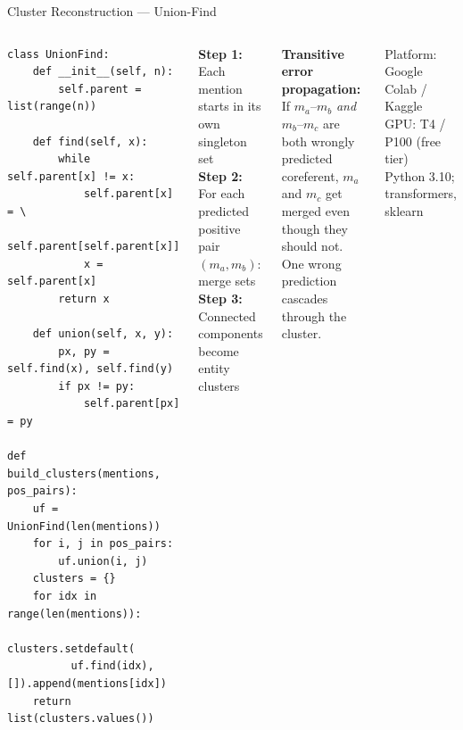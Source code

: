 \documentclass[aspectratio=169]{beamer}
\begin{document}
\begin{frame}[fragile]{Cluster Reconstruction — Union-Find}
  \begin{columns}[T]
      \begin{tcolorbox}[nbox={Python Implementation}]
\begin{lstlisting}
class UnionFind:
    def __init__(self, n):
        self.parent = list(range(n))

    def find(self, x):
        while self.parent[x] != x:
            self.parent[x] = \
              self.parent[self.parent[x]]
            x = self.parent[x]
        return x

    def union(self, x, y):
        px, py = self.find(x), self.find(y)
        if px != py:
            self.parent[px] = py

def build_clusters(mentions, pos_pairs):
    uf = UnionFind(len(mentions))
    for i, j in pos_pairs:
        uf.union(i, j)
    clusters = {}
    for idx in range(len(mentions)):
        clusters.setdefault(
          uf.find(idx),[]).append(mentions[idx])
    return list(clusters.values())
\end{lstlisting}
      \end{tcolorbox}

      \begin{tcolorbox}[rbox={How It Works}]
        \small
        \textbf{Step 1:} Each mention starts
        in its own singleton set\\[4pt]
        \textbf{Step 2:} For each predicted
        positive pair $(m_a,m_b)$: merge sets\\[4pt]
        \textbf{Step 3:} Connected components
        become entity clusters
      \end{tcolorbox}

      \vspace{6pt}
      \begin{tcolorbox}[wbox={Known Weakness}]
        \small
        \textbf{Transitive error propagation:}\\[3pt]
        If $m_a$--$m_b$ \emph{and} $m_b$--$m_c$ are
        both wrongly predicted coreferent,
        $m_a$ and $m_c$ get merged even though
        they should not.\\[3pt]
        One wrong prediction cascades through
        the cluster.
      \end{tcolorbox}

      \vspace{6pt}
      \begin{tcolorbox}[gbox={Compute Environment}]
        \small
        Platform: Google Colab / Kaggle\\
        GPU: T4 / P100 (free tier)\\
        Python 3.10; transformers, sklearn
      \end{tcolorbox}
  \end{columns}
\end{frame}
\end{document}
